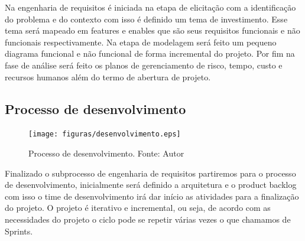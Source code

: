 Na engenharia de requisitos é iniciada na etapa de elicitação com a identificação do problema e do contexto com isso é definido um tema de investimento. Esse tema será mapeado em features e enables que são seus requisitos funcionais e não funcionais respectivamente. Na etapa de modelagem será feito um pequeno diagrama funcional e não funcional de forma incremental do projeto. Por fim na fase de análise será feito os planos de gerenciamento de risco, tempo, custo e recursos humanos além do termo de abertura de projeto.

\subsection{Processo de desenvolvimento}

\begin{figure}[ht]
	\centering
    \texttt{[image: figuras/desenvolvimento.eps]}
    \caption[Processo de desenvolvimento.]{Processo de desenvolvimento. Fonte: Autor}
	\label{fig:desenvolvimento}
\end{figure}

Finalizado o subprocesso de engenharia de requisitos partiremos para o processo de desenvolvimento, inicialmente será definido a arquitetura e o product backlog com isso o time de desenvolvimento irá dar início as atividades para a finalização do projeto. O projeto é iterativo e incremental, ou seja, de acordo com as necessidades do projeto o ciclo pode se repetir várias vezes o que chamamos de Sprints.